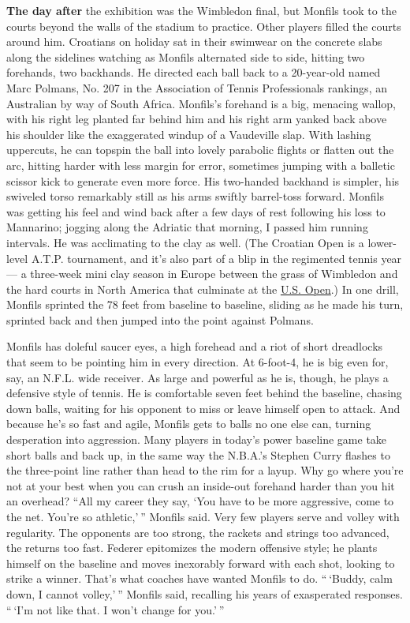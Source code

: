 \textbf{The day after} the exhibition was the Wimbledon final, but
Monfils took to the courts beyond the walls of the stadium to practice.
Other players filled the courts around him. Croatians on holiday sat in
their swimwear on the concrete slabs along the sidelines watching as
Monfils alternated side to side, hitting two forehands, two backhands.
He directed each ball back to a 20-year-old named Marc Polmans, No. 207
in the Association of Tennis Professionals rankings, an Australian by
way of South Africa. Monfils's forehand is a big, menacing wallop, with
his right leg planted far behind him and his right arm yanked back above
his shoulder like the exaggerated windup of a Vaudeville slap. With
lashing uppercuts, he can topspin the ball into lovely parabolic flights
or flatten out the arc, hitting harder with less margin for error,
sometimes jumping with a balletic scissor kick to generate even more
force. His two-handed backhand is simpler, his swiveled torso remarkably
still as his arms swiftly barrel-toss forward. Monfils was getting his
feel and wind back after a few days of rest following his loss to
Mannarino; jogging along the Adriatic that morning, I passed him running
intervals. He was acclimating to the clay as well. (The Croatian Open is
a lower-level A.T.P. tournament, and it's also part of a blip in the
regimented tennis year --- a three-week mini clay season in Europe
between the grass of Wimbledon and the hard courts in North America that
culminate at the
\href{http://topics.nytimes3xbfgragh.onion/top/reference/timestopics/subjects/u/united_states_open_tennis/index.html?inline=nyt-classifier}{U.S.
Open}.) In one drill, Monfils sprinted the 78 feet from baseline to
baseline, sliding as he made his turn, sprinted back and then jumped
into the point against Polmans.

Monfils has doleful saucer eyes, a high forehead and a riot of short
dreadlocks that seem to be pointing him in every direction. At 6-foot-4,
he is big even for, say, an N.F.L. wide receiver. As large and powerful
as he is, though, he plays a defensive style of tennis. He is
comfortable seven feet behind the baseline, chasing down balls, waiting
for his opponent to miss or leave himself open to attack. And because
he's so fast and agile, Monfils gets to balls no one else can, turning
desperation into aggression. Many players in today's power baseline game
take short balls and back up, in the same way the N.B.A.'s Stephen Curry
flashes to the three-point line rather than head to the rim for a layup.
Why go where you're not at your best when you can crush an inside-out
forehand harder than you hit an overhead? ``All my career they say, `You
have to be more aggressive, come to the net. You're so athletic,' ''
Monfils said. Very few players serve and volley with regularity. The
opponents are too strong, the rackets and strings too advanced, the
returns too fast. Federer epitomizes the modern offensive style; he
plants himself on the baseline and moves inexorably forward with each
shot, looking to strike a winner. That's what coaches have wanted
Monfils to do. `` `Buddy, calm down, I cannot volley,' '' Monfils said,
recalling his years of exasperated responses. `` `I'm not like that. I
won't change for you.' ''

